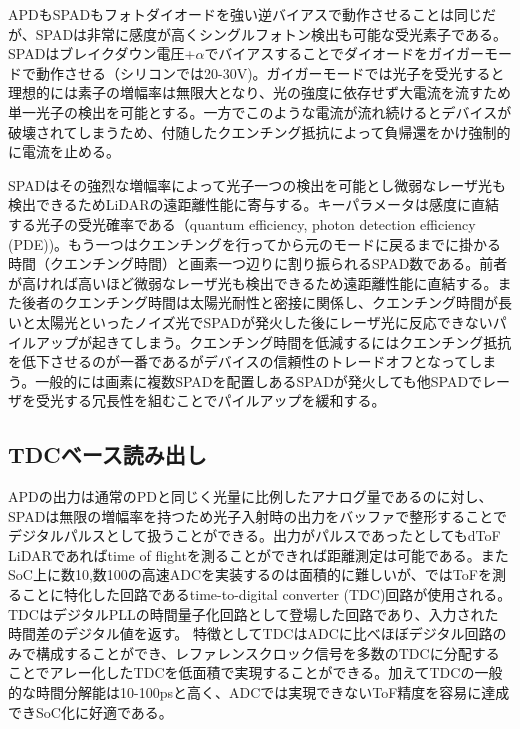 \documentclass[letterpaper, 10 pt, conference]{ieeeconf}  %
\begin{document}
APDもSPADもフォトダイオードを強い逆バイアスで動作させることは同じだが、SPADは非常に感度が高くシングルフォトン検出も可能な受光素子である\cite{niclass2005design, zappa2007spad, stoppa2009spad, niclass2007spad, gariepy2015single}。SPADはブレイクダウン電圧+$\alpha$でバイアスすることでダイオードをガイガーモードで動作させる（シリコンでは20-30V)。ガイガーモードでは光子を受光すると理想的には素子の増幅率は無限大となり、光の強度に依存せず大電流を流すため単一光子の検出を可能とする。一方でこのような電流が流れ続けるとデバイスが破壊されてしまうため、付随したクエンチング抵抗によって負帰還をかけ強制的に電流を止める。

SPADはその強烈な増幅率によって光子一つの検出を可能とし微弱なレーザ光も検出できるためLiDARの遠距離性能に寄与する。キーパラメータは感度に直結する光子の受光確率である（quantum efficiency, photon detection efficiency (PDE))。もう一つはクエンチングを行ってから元のモードに戻るまでに掛かる時間（クエンチング時間）と画素一つ辺りに割り振られるSPAD数である。前者が高ければ高いほど微弱なレーザ光も検出できるため遠距離性能に直結する。また後者のクエンチング時間は太陽光耐性と密接に関係し、クエンチング時間が長いと太陽光といったノイズ光でSPADが発火した後にレーザ光に反応できないパイルアップが起きてしまう。クエンチング時間を低減するにはクエンチング抵抗を低下させるのが一番であるがデバイスの信頼性のトレードオフとなってしまう。一般的には画素に複数SPADを配置しあるSPADが発火しても他SPADでレーザを受光する冗長性を組むことでパイルアップを緩和する。

\subsection{TDCベース読み出し}
APDの出力は通常のPDと同じく光量に比例したアナログ量であるのに対し、SPADは無限の増幅率を持つため光子入射時の出力をバッファで整形することでデジタルパルスとして扱うことができる。出力がパルスであったとしてもdToF LiDARであればtime of flightを測ることができれば距離測定は可能である。またSoC上に数10,数100の高速ADCを実装するのは面積的に難しいが、\cite{niclass2012100}ではToFを測ることに特化した回路であるtime-to-digital converter (TDC)回路が使用される。TDCはデジタルPLLの時間量子化回路として登場した回路であり、入力された時間差のデジタル値を返す\cite{leetdc, elkholytdc}。
特徴としてTDCはADCに比べほぼデジタル回路のみで構成することができ、レファレンスクロック信号を多数のTDCに分配することでアレー化したTDCを低面積で実現することができる。加えてTDCの一般的な時間分解能は10-100psと高く、ADCでは実現できないToF精度を容易に達成できSoC化に好適である。
\end{document}
